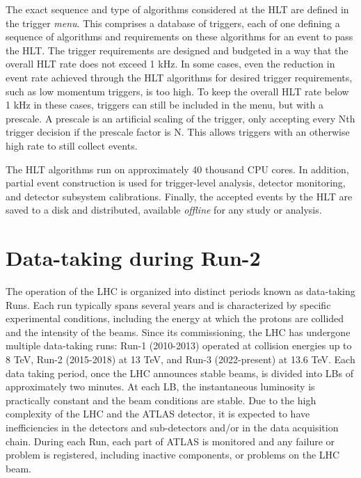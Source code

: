 The exact sequence and type of algorithms considered at the \ac{HLT} are defined in the trigger \textit{menu}. This comprises a database of triggers, each of one defining a sequence of algorithms and requirements on these algorithms for an event to pass the \ac{HLT}.
The trigger requirements are designed and budgeted in a way that the overall \ac{HLT} rate does not exceed 1 kHz. In some cases, even the reduction in event rate achieved through the \ac{HLT} algorithms for desired trigger requirements, such as low momentum triggers, is too high. To keep the overall \ac{HLT} rate below 1 kHz in these cases, triggers can still be included in the menu, but with a prescale. A prescale is an artificial scaling of the trigger, only accepting every Nth trigger decision if the prescale factor is N. This allows triggers with an otherwise high rate to still collect events.

The \ac{HLT} algorithms run on approximately 40 thousand CPU cores. In addition, partial event construction is used for trigger-level analysis, detector monitoring, and detector subsystem calibrations. Finally, the accepted events by the \ac{HLT} are saved to a disk and distributed, available \textit{offline} for any study or analysis.






\FloatBarrier
\section{Data-taking during Run-2}
\label{sec:atlas:runs}


The operation of the \ac{LHC} is organized into distinct periods known as data-taking Runs. Each run typically spans several years and is characterized by specific experimental conditions, including the energy at which the protons are collided and the intensity of the beams. Since its commissioning, the \ac{LHC} has undergone multiple data-taking runs: Run-1 (2010-2013) operated at collision energies up to 8 TeV, Run-2 (2015-2018) at 13 TeV, and Run-3 (2022-present) at 13.6 TeV. Each data taking period, once the \ac{LHC} announces stable beams, is divided into \acp{LB} of approximately two minutes. At each \ac{LB}, the instantaneous luminosity is practically constant and the beam conditions are stable. Due to the high complexity of the \ac{LHC} and the \ac{ATLAS} detector, it is expected to have inefficiencies in the detectors and sub-detectors and/or in the data acquisition chain. During each Run, each part of \ac{ATLAS} is monitored and any failure or problem is registered, including inactive components, or problems on the \ac{LHC} beam.

